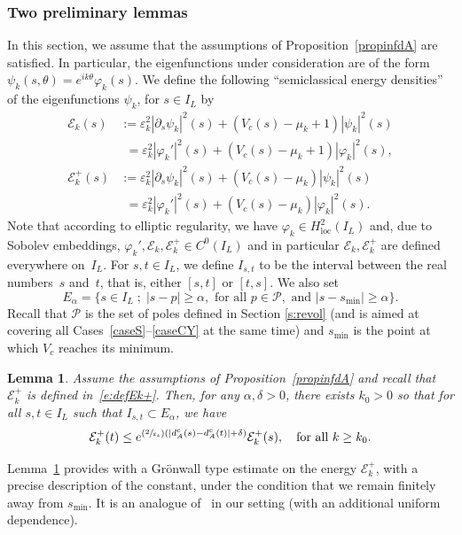 \documentclass[11pt]{article}
\numberwithin{equation}{section}
\newcommand{\Psfrac}[2]{(\sfrac{#1}{#2})}
\newcommand{\sep}{\;;\;}
\newtheorem{lemma}{Lemma}[section]
\theoremstyle{definition}
\newcommand{\Ek}{\mathcal{E}_k}
\newcommand{\loc}{\mathrm{loc}}
\newcommand{\ce}{c}
\let\d\partial
\let\e\varepsilon
\let\eps\varepsilon
\begin{document}
\subsubsection{Two preliminary lemmas}
In this section, we assume that the assumptions of Proposition~\ref{propinfdA} are satisfied. In particular, the eigenfunctions under consideration are of the form $\psi_k(s, \theta) = e^{ik \theta}\varphi_k(s)$.
We define the following ``semiclassical energy densities'' of the eigenfunctions $\psi_k$, for $s \in I_L$ by
\begin{align}
\label{e:defEk}\Ek(s)&:= \eps_k^2 |\d_s \psi_k|^2(s)+ (V_\ce(s) -\mu_k+1)|\psi_k|^2(s) \\
& \phantom{:}= \eps_k^2 |\varphi_k'|^2(s)+ (V_\ce(s) -\mu_k+1)|\varphi_k|^2(s),\nonumber \\
\label{e:defEk+} \Ek^+(s)&:=\eps_k^2 |\d_s \psi_k|^2(s)+(V_\ce(s) -\mu_k)|\psi_k|^2(s) \\
& \phantom{:}=\eps_k^2 |\varphi_k'|^2(s)+(V_\ce(s) -\mu_k)|\varphi_k|^2(s). \nonumber
\end{align}
Note that according to elliptic regularity, we have $\varphi_k \in H^2_{\loc}(I_L)$ and, due to Sobolev embeddings, $\varphi_k', \Ek, \Ek^+ \in C^0(I_L)$ and in particular $\Ek, \Ek^+$ are defined everywhere on~$I_L$.
For $s, t \in I_L$, we define $I_{s,t}$ to be the interval between the real numbers~$s$ and~$t$, that is, either $[s,t]$ or $[t,s]$.
We also set
\begin{equation}
\label{e:def-E-alpha}
E_\alpha = \{ s \in I_L \sep |s-p| \geq \alpha, \text{ for all } p\in\mathcal{P}, \text{ and }|s-s_{\min}|\geq \alpha \}.
\end{equation}
Recall that $\mathcal{P}$ is the set of poles defined in Section \ref{s:revol} (and is aimed at covering all Cases~\ref{caseS}--\ref{caseCY}
at the same time) and $s_{\min}$ is the point at which $V_{\ce}$ reaches its minimum.
\begin{lemma}
\label{GronwallAgmon}
Assume the assumptions of Proposition~\ref{propinfdA} and recall that $\Ek^+$ is defined in~\eqref{e:defEk+}.
Then, for any $\alpha,\delta>0$, there exists $k_0>0$ so that for all $s,t \in I_L$ such that $I_{s,t} \subset E_\alpha$, we have
\[
\Ek^+(t)\leq e^{\Psfrac{2}{\e_k}\left(|d_A^{\ce}(s)-d_A^{\ce}(t)|+\delta\right)}\Ek^+(s), \quad \text{for all }k\geq k_0.
\]
\end{lemma}
Lemma~\ref{GronwallAgmon} provides with a Grönwall type estimate on the energy $\Ek^+$, with a precise description of the constant, under the condition that we remain finitely away from $s_{\min}$. It is an analogue of~\cite[Lem.\,12]{Allibert:98} in our setting (with an additional uniform dependence).
\end{document}
